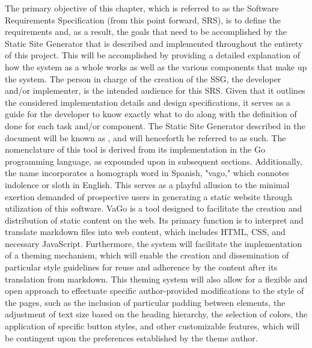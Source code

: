 \markdownRendererDocumentBegin
{}\markdownRendererInterblockSeparator
{}\markdownRendererInterblockSeparator
{}The primary objective of this chapter, which is referred to as the Software Requirements Specification (from this point forward, SRS), is to define the requirements and, as a result, the goals that need to be accomplished by the Static Site Generator that is described and implemented throughout the entirety of this project. This will be accomplished by providing a detailed explanation of how the system as a whole works as well as the various components that make up the system.\markdownRendererInterblockSeparator
{}The person in charge of the creation of the SSG, the developer and/or implementer, is the intended audience for this SRS. Given that it outlines the considered implementation details and design specifications, it serves as a guide for the developer to know exactly what to do along with the definition of done for each task and/or component.\markdownRendererInterblockSeparator
{}\markdownRendererInterblockSeparator
{}The Static Site Generator described in the document will be known as , and will henceforth be referred to as such. The nomenclature of this tool is derived from its implementation in the Go programming language, as expounded upon in subsequent sections. Additionally, the name incorporates a homograph word in Spanish, "vago," which connotes indolence or sloth in English. This serves as a playful allusion to the minimal exertion demanded of prospective users in generating a static website through utilization of this software.\markdownRendererInterblockSeparator
{}VaGo is a tool designed to facilitate the creation and distribution of static content on the web. Its primary function is to interpret and translate markdown files into web content, which includes HTML, CSS, and necessary JavaScript. Furthermore, the system will facilitate the implementation of a theming mechanism, which will enable the creation and dissemination of particular style guidelines for reuse and adherence by the content after its translation from markdown. This theming system will also allow for a flexible and open approach to effectuate specific author-provided modifications to the style of the pages, such as the inclusion of particular padding between elements, the adjustment of text size based on the heading hierarchy, the selection of colors, the application of specific button styles, and other customizable features, which will be contingent upon the preferences established by the theme author.\markdownRendererInterblockSeparator
